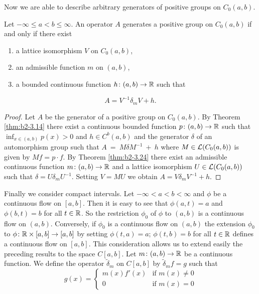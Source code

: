 Now we are able to describe arbitrary generators of positive groups on $C_{0}(a,b)$.
\begin{theorem}\label{thm:b2-3.25}
%
Let $-\infty \leq a < b \leq \infty$.
An operator $A$ generates a positive group on $C_{0}(a,b)$ if and only if there exist
\begin{enumerate}[\upshape (i)]
\item 
a lattice isomorphism $V$ on $C_{0}(a,b)$,
\item 
an admissible function $m$ on $(a,b)$,
\item 
a bounded continuous function $h \colon (a,b) \to \mathbb{R}$ such that
\end{enumerate}
\begin{equation}\label{eq:b2-3.24}
A = V^{-1}\delta_{m}V + h.
\end{equation}
\end{theorem}
\begin{proof}
Let $A$ be the generator of a positive group on $C_{0}(a,b)$.
By Theorem \ref{thm:b2-3.14} 
there exist a continuous bounded function $p \colon (a,b) \to \mathbb{R}$ such that $\inf_{x \in (a,b)} p(x) > 0$ and $h \in C^{b}(a,b)$ 
and the generator $\delta$ of an automorphism group such that $A~=~M\delta M^{-1}~+~h$ 
where $M \in \mathcal{L}(C_{0}(a,b))$ is given by $Mf = p \cdot f$.
By Theorem \ref{thm:b2-3.24} there exist an admissible continuous function $m \colon (a,b) \to \mathbb{R}$ and a lattice isomorphism $U \in \mathcal{L}(C_{0}(a,b))$ such that $\delta = U\delta_{m}U^{-1}$.
Setting $V = MU$ we obtain $A = V\delta_{m}V^{-1} + h$.
\end{proof}
Finally we consider compact intervals.
Let $-\infty < a < b < \infty$ and $\phi$ be a continuous flow on $[a,b]$.
Then it is easy to see that $\phi(a,t) = a$ and $\phi(b,t) = b$ for all $t \in \mathbb{R}$.
So the restriction $\phi_{0}$ of $\phi$ to $(a,b)$ is a continuous flow on $(a,b)$.
Conversely, if $\phi_{0}$ is a continuous flow on $(a,b)$ the extension $\phi_{0}$ to $\phi \colon \mathbb{R} \times [a,b] \to [a,b]$ by setting $\phi(t,a) = a$; $\phi(t,b) = b$ for all $t \in \mathbb{R}$ defines a continuous flow on $[a,b]$.
This consideration allows us to extend easily the preceding results to the space $C[a,b]$.
Let $m \colon (a,b) \to \mathbb{R}$ be a continuous function.
We define the operator $\widetilde{\delta}_{m}$ on $C[a,b]$ by $\widetilde{\delta}_{m}f = g$ such that
\begin{equation}\label{eq:b2-3.25}
g(x) = \begin{cases}
    m(x)f'(x) & \text{if } m(x) \neq 0 \\
    0 & \text{if } m(x) = 0
\end{cases}
\end{equation}
